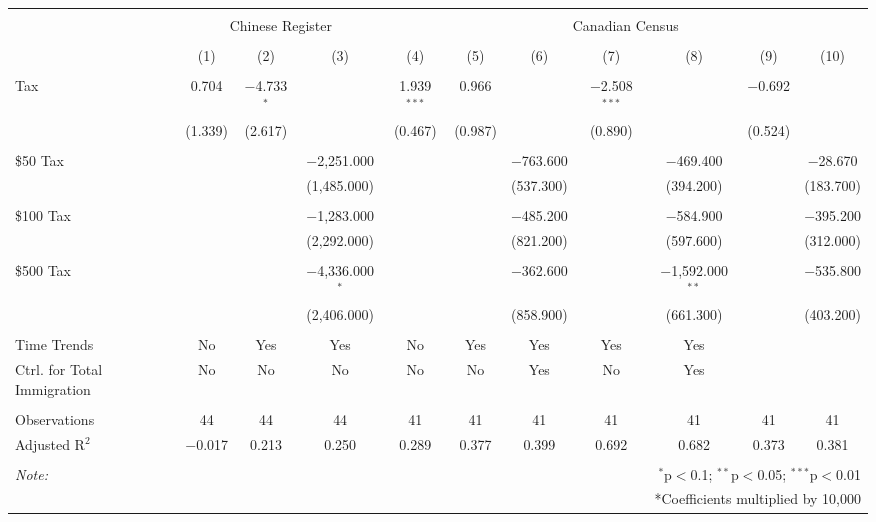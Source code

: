 
\begin{tabular}{@{\extracolsep{5pt}}lcccccccccc} 
\\[-1.8ex]\hline 
\hline \\[-1.8ex] 
 & \multicolumn{3}{c}{Chinese Register} & \multicolumn{7}{c}{Canadian Census} \\ 
\\[-1.8ex] & (1) & (2) & (3) & (4) & (5) & (6) & (7) & (8) & (9) & (10)\\ 
\hline \\[-1.8ex] 
 Tax & 0.704 & $-$4.733$^{*}$ &  & 1.939$^{***}$ & 0.966 &  & $-$2.508$^{***}$ &  & $-$0.692 &  \\ 
  & (1.339) & (2.617) &  & (0.467) & (0.987) &  & (0.890) &  & (0.524) &  \\ 
  & & & & & & & & & & \\ 
 \$50 Tax &  &  & $-$2,251.000 &  &  & $-$763.600 &  & $-$469.400 &  & $-$28.670 \\ 
  &  &  & (1,485.000) &  &  & (537.300) &  & (394.200) &  & (183.700) \\ 
  & & & & & & & & & & \\ 
 \$100 Tax &  &  & $-$1,283.000 &  &  & $-$485.200 &  & $-$584.900 &  & $-$395.200 \\ 
  &  &  & (2,292.000) &  &  & (821.200) &  & (597.600) &  & (312.000) \\ 
  & & & & & & & & & & \\ 
 \$500 Tax &  &  & $-$4,336.000$^{*}$ &  &  & $-$362.600 &  & $-$1,592.000$^{**}$ &  & $-$535.800 \\ 
  &  &  & (2,406.000) &  &  & (858.900) &  & (661.300) &  & (403.200) \\ 
  & & & & & & & & & & \\ 
Time Trends & No & Yes & Yes & No & Yes & Yes & Yes & Yes &  &  \\ 
Ctrl. for Total Immigration & No & No & No & No & No & Yes & No & Yes &  &  \\ 
\hline \\[-1.8ex] 
Observations & 44 & 44 & 44 & 41 & 41 & 41 & 41 & 41 & 41 & 41 \\ 
Adjusted R$^{2}$ & $-$0.017 & 0.213 & 0.250 & 0.289 & 0.377 & 0.399 & 0.692 & 0.682 & 0.373 & 0.381 \\ 
\hline \\[-1.8ex] 
\textit{Note:}  & \multicolumn{10}{r}{$^{*}$p$<$0.1; $^{**}$p$<$0.05; $^{***}$p$<$0.01} \\ 
 & \multicolumn{10}{r}{*Coefficients multiplied by 10,000} \\ 
\end{tabular} 
